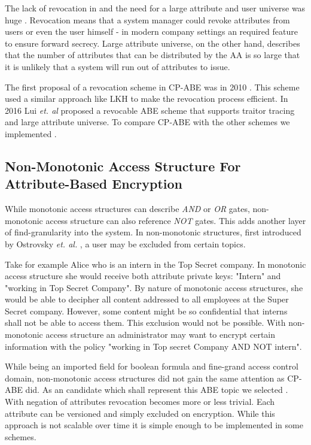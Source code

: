 The lack of revocation  in \cite{bethencourt2007ciphertext} and the need for a large attribute and user universe was huge . Revocation means that a system manager could revoke attributes from users or even the user himself - in modern company settings an required feature to ensure forward secrecy. Large attribute universe, on the other hand, describes that the number of attributes that can be distributed by the \ac{AA} is so large that it is unlikely that a system will run out of attributes to issue. 

The first proposal of a revocation scheme in \ac{CP-ABE} was in 2010 \cite{liang2010ciphertext}. This scheme used a similar approach like \ac{LKH} to make the revocation process efficient. In 2016 Lui \textit{et. al} \cite{liu2016practical} proposed a revocable \ac{ABE} scheme that supports traitor tracing and large attribute universe. To compare CP-ABE with the other schemes we implemented \cite{liu2016practical}. 

\subsection{Non-Monotonic Access Structure For Attribute-Based Encryption}
While monotonic access structures can describe \textit{AND} or \textit{OR} gates, non-monotonic access structure can also reference \textit{NOT} gates. This adds another layer of find-granularity into the system. In non-monotonic structures, first introduced by Ostrovsky \textit{et. al.} \cite{Ostrovsky:2007:AEN:1315245.1315270}, a user may be excluded from certain topics. 

Take for example Alice who is an intern in the Top Secret company. In monotonic access structure she would receive both attribute private keys: "Intern" and "working in Top Secret Company". By nature of monotonic access structures, she would be able to decipher all content addressed to all employees at the Super Secret company. However, some content might be so confidential that interns shall not be able to access them. This exclusion would not be possible. With non-monotonic access structure an administrator may want to encrypt certain information with the policy "working in Top secret Company AND NOT intern".  

While being an imported field for boolean formula and fine-grand access control domain, non-monotonic access structures did not gain the same attention as \ac{CP-ABE} did. As an candidate which shall represent this \ac{ABE} topic we selected \cite{10.1007/978-3-642-54631-0_16}. With negation of attributes revocation becomes more or less trivial. Each attribute can be versioned and simply excluded on encryption. While this approach is not scalable over time it is simple enough to be implemented in some schemes.   

